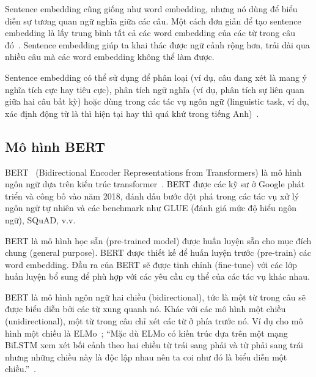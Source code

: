 
Sentence embedding cũng giống như word embedding, nhưng nó dùng để biểu diễn sự
tương quan ngữ nghĩa giữa các câu. Một cách đơn giản để tạo sentence embedding
là lấy trung bình tất cả các word embedding của các từ trong câu
đó~\cite{lamGomCumVan2021}. Sentence embedding giúp ta khai thác được ngữ cảnh rộng hơn, trải dài qua nhiều câu mà các word embedding không thể làm được.

Sentence embedding có thể sử dụng để phân loại (ví dụ, câu đang xét là mang ý
nghĩa tích cực hay tiêu cực), phân tích ngữ nghĩa (ví dụ, phân tích sự liên
quan giữa hai câu bất kỳ) hoặc dùng trong các tác vụ ngôn ngữ (linguistic task,
ví dụ, xác định động từ là thì hiện tại hay thì quá khứ trong tiếng
Anh)~\cite{heidenreichPaperSummaryEvaluation2018}.

\subsection{Mô hình BERT}
BERT~\cite{devlinBERTPretrainingDeep2019} (Bidirectional Encoder
Representations from Transformers) là mô hình ngôn ngữ dựa trên kiến trúc
transformer~\cite{vaswaniAttentionAllYou2017}. BERT được các kỹ sư ở Google
phát triển và công bố vào năm 2018, đánh dấu bước đột phá trong các tác vụ xử
lý ngôn ngữ tự nhiên và các benchmark như GLUE (đánh giá mức độ hiểu ngôn ngữ),
SQuAD, v.v.

BERT là mô hình học sẵn (pre-trained model) được huấn luyện sẵn cho mục đích
chung (general purpose). BERT được thiết kế để huấn luyện trước (pre-train) các word embedding. Đầu ra của BERT sẽ được tinh chỉnh (fine-tune) với các
lớp huấn luyện bổ sung để phù hợp với các yêu cầu cụ thể của các tác vụ khác
nhau.

BERT là mô hình ngôn ngữ hai chiều (bidirectional), tức là một từ trong câu sẽ
được biểu diễn bởi các từ xung quanh nó. Khác với các mô hình một chiều
(unidirectional), một từ trong câu chỉ xét các từ ở phía trước nó. Ví dụ cho mô
hình một chiều là ELMo~\cite{petersDeepContextualizedWord2018}; ``Mặc dù ELMo có
kiến trúc dựa trên một mạng BiLSTM xem xét bối cảnh theo hai chiều từ trái sang
phải và từ phải sang trái nhưng những chiều này là độc lập nhau nên ta coi như
đó là biểu diễn một chiều.''~\cite{khanhBERTModel2020}.

